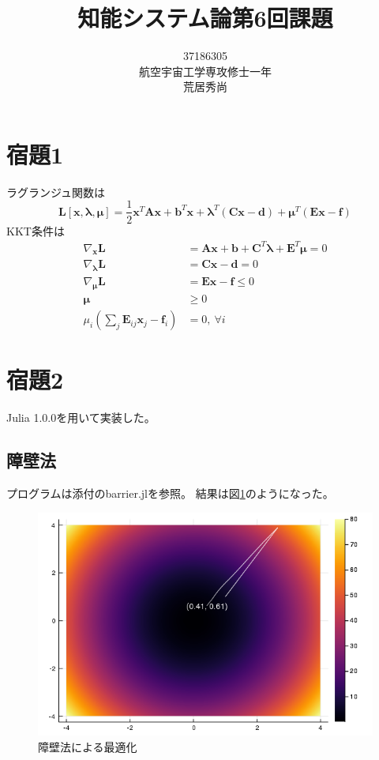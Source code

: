 \documentclass[10pt,a4paper]{ltjsarticle}       %
\title{知能システム論第6回課題}
\author{37186305\\航空宇宙工学専攻修士一年\\荒居秀尚}
\begin{document}
    \maketitle
    \section{宿題1}
    ラグランジュ関数は
    \begin{equation}
    \bm{L}[\bm{x}, \bm{\lambda}, \bm{\mu}] = \frac{1}{2}\bm{x}^T \bm{A}\bm{x} + \bm{b}^T\bm{x} + \bm{\lambda}^T(\bm{Cx} - \bm{d}) + \bm{\mu}^T(\bm{Ex} - \bm{f})
    \end{equation}
    KKT条件は
    \begin{align}
    \nabla_{\bm{x}} \bm{L} &= \bm{Ax} + \bm{b} + \bm{C}^T\bm{\lambda} + \bm{E}^T\bm{\mu} = 0\\
    \nabla_{\bm{\lambda}}\bm{L} &= \bm{Cx} -\bm{d} = 0 \\
    \nabla_{\bm{\mu}}\bm{L} &= \bm{Ex} - \bm{f} \le 0 \\
    \bm{\mu} &\ge 0 \\
    \mu_i \left( \sum_j\bm{E}_{ij} \bm{x}_j - \bm{f}_i \right) &= 0, ~\forall i
    \end{align}
    \section{宿題2}
    Julia 1.0.0を用いて実装した。
    \subsection{障壁法}
    プログラムは添付のbarrier.jlを参照。
    結果は図\ref{fig:barrier}のようになった。
    \begin{figure}[htbp]
      \begin{center}
        \includegraphics[clip, scale=0.6]{barrier.png}
        \caption{障壁法による最適化}
        \label{fig:barrier}
      \end{center}
    \end{figure}
\end{document}
